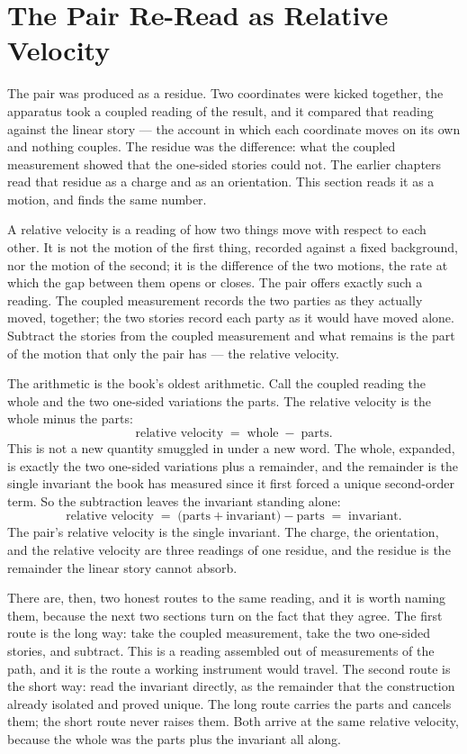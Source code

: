 \section{The Pair Re-Read as Relative Velocity}

The pair was produced as a residue. Two coordinates were kicked together, the apparatus took
a coupled reading of the result, and it compared that reading against the linear story --- the
account in which each coordinate moves on its own and nothing couples. The residue was the
difference: what the coupled measurement showed that the one-sided stories could not. The
earlier chapters read that residue as a charge and as an orientation. This section reads it as
a motion, and finds the same number.

A relative velocity is a reading of how two things move with respect to each other. It is not
the motion of the first thing, recorded against a fixed background, nor the motion of the
second; it is the difference of the two motions, the rate at which the gap between them opens
or closes. The pair offers exactly such a reading. The coupled measurement records the two
parties as they actually moved, together; the two stories record each party as it would have
moved alone. Subtract the stories from the coupled measurement and what remains is the part of
the motion that only the pair has --- the relative velocity.

The arithmetic is the book's oldest arithmetic. Call the coupled reading the whole and the two
one-sided variations the parts. The relative velocity is the whole minus the parts:
\[
  \text{relative velocity} \;=\; \text{whole} \;-\; \text{parts}.
\]
This is not a new quantity smuggled in under a new word. The whole, expanded, is exactly the
two one-sided variations plus a remainder, and the remainder is the single invariant the book
has measured since it first forced a unique second-order term. So the subtraction leaves the
invariant standing alone:
\[
  \text{relative velocity} \;=\; \big(\text{parts} + \text{invariant}\big) - \text{parts}
  \;=\; \text{invariant}.
\]
The pair's relative velocity is the single invariant. The charge, the orientation, and the
relative velocity are three readings of one residue, and the residue is the remainder the
linear story cannot absorb.

There are, then, two honest routes to the same reading, and it is worth naming them, because
the next two sections turn on the fact that they agree. The first route is the long way: take
the coupled measurement, take the two one-sided stories, and subtract. This is a reading
assembled out of measurements of the path, and it is the route a working instrument would
travel. The second route is the short way: read the invariant directly, as the remainder that
the construction already isolated and proved unique. The long route carries the parts and
cancels them; the short route never raises them. Both arrive at the same relative velocity,
because the whole was the parts plus the invariant all along.


